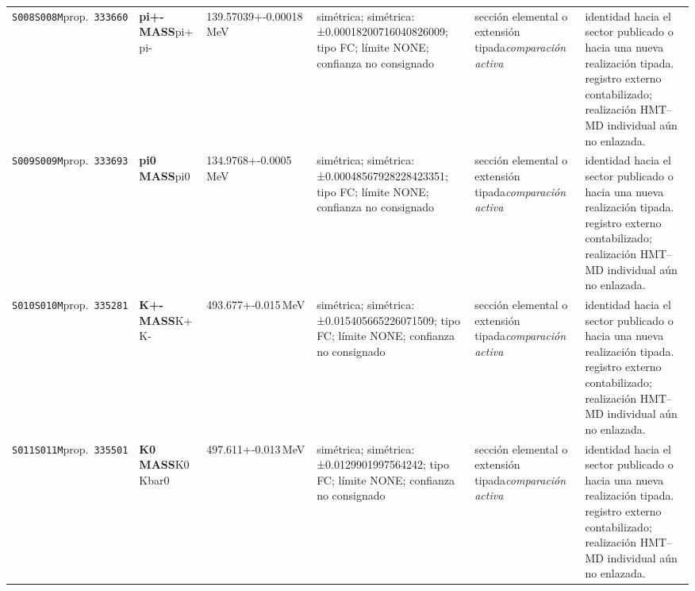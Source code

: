 \begin{landscape}
\begin{longtable}{L{1.85cm}L{4.45cm}L{2.35cm}L{4.05cm}L{3.35cm}L{7.15cm}}
\texttt{S008}\newline \texttt{S008M}\newline prop.\ \texttt{333660} & \textbf{pi+- MASS}\newline pi+ \textbar{}\allowbreak{} pi- & 139.57039+-0.00018\,MeV & simétrica; simétrica: ±0.00018200716040826009; tipo FC; límite NONE; confianza no consignado & sección elemental o extensión tipada\newline \emph{comparación activa} & identidad hacia el sector publicado o hacia una nueva realización tipada. registro externo contabilizado; realización HMT--MD individual aún no enlazada. \\
\texttt{S009}\newline \texttt{S009M}\newline prop.\ \texttt{333693} & \textbf{pi0 MASS}\newline pi0 & 134.9768+-0.0005\,MeV & simétrica; simétrica: ±0.00048567928228423351; tipo FC; límite NONE; confianza no consignado & sección elemental o extensión tipada\newline \emph{comparación activa} & identidad hacia el sector publicado o hacia una nueva realización tipada. registro externo contabilizado; realización HMT--MD individual aún no enlazada. \\
\texttt{S010}\newline \texttt{S010M}\newline prop.\ \texttt{335281} & \textbf{K+- MASS}\newline K+ \textbar{}\allowbreak{} K- & 493.677+-0.015\,MeV & simétrica; simétrica: ±0.015405665226071509; tipo FC; límite NONE; confianza no consignado & sección elemental o extensión tipada\newline \emph{comparación activa} & identidad hacia el sector publicado o hacia una nueva realización tipada. registro externo contabilizado; realización HMT--MD individual aún no enlazada. \\
\texttt{S011}\newline \texttt{S011M}\newline prop.\ \texttt{335501} & \textbf{K0 MASS}\newline K0 \textbar{}\allowbreak{} Kbar0 & 497.611+-0.013\,MeV & simétrica; simétrica: ±0.0129901997564242; tipo FC; límite NONE; confianza no consignado & sección elemental o extensión tipada\newline \emph{comparación activa} & identidad hacia el sector publicado o hacia una nueva realización tipada. registro externo contabilizado; realización HMT--MD individual aún no enlazada. \\

\end{longtable}
\end{landscape}

